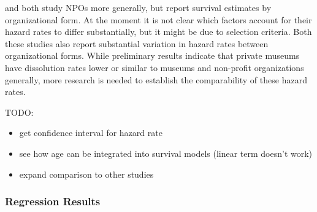 \documentclass[11pt]{article}
\begin{document}
\textcite{Hager_2001_vulnerability} and \textcite{Gordon_etal_2013_insolvency} both study NPOs more generally, but report survival estimates by organizational form.
At the moment it is not clear which factors account for their hazard rates to differ substantially, but it might be due to selection criteria.
Both these studies also report substantial variation in hazard rates between organizational forms.
While preliminary results indicate that private museums have dissolution rates lower or similar to museums and non-profit organizations generally, more research is needed to establish the comparability of these hazard rates.


\noindent
TODO:
\begin{itemize}
\item get confidence interval for hazard rate
\item see how age can be integrated into survival models (linear term doesn't work)
\item expand comparison to other studies
\end{itemize}



\subsubsection*{Regression Results}
\end{document}
